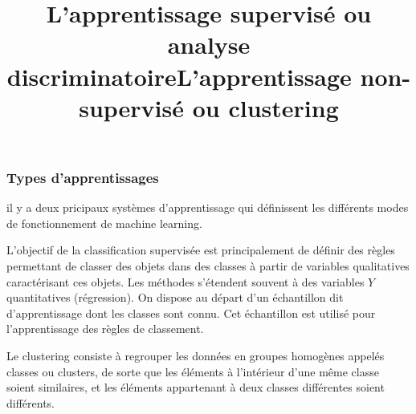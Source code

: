 \documentclass[a4paper,12pt]{article}
\begin{document}
\subsubsection{Types d'apprentissages}
il y a deux pricipaux systèmes d'apprentissage qui définissent les différents modes de fonctionnement de machine learning.\newline
\title{\textbf{L’apprentissage supervisé ou analyse discriminatoire}}\newline
L'objectif de la classification supervisée est principalement de définir des règles permettant de classer des objets dans des classes
à partir de variables qualitatives caractérisant ces objets. Les méthodes s'étendent souvent à des variables $Y$ quantitatives (régression).
On dispose au départ d'un échantillon dit d'apprentissage dont les classes sont connu. Cet échantillon est utilisé pour l'apprentissage des règles de classement.\newline 
\title{\textbf{L’apprentissage non-supervisé ou clustering}}\newline
Le clustering consiste à regrouper les données en groupes homogènes appelés classes ou clusters, de sorte que les éléments à l’intérieur d’une même classe soient similaires, et les éléments appartenant à deux classes différentes soient différents.  
\end{document}
